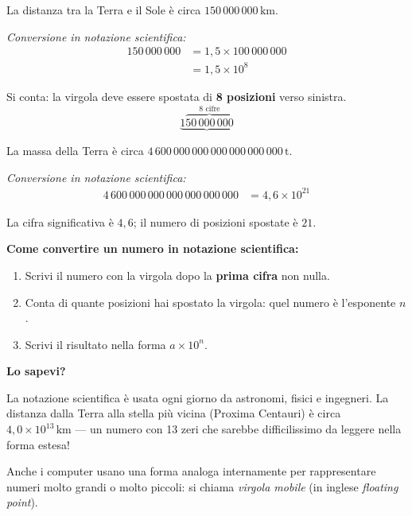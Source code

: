 \begin{esempio}
  La distanza tra la Terra e il Sole è circa $150\,000\,000\,\text{km}$.

  \textit{Conversione in notazione scientifica:}
  \begin{align*}
    150\,000\,000 & = 1{,}5 \times 100\,000\,000 \\
                  & = 1{,}5 \times 10^8
  \end{align*}

  Si conta: la virgola deve essere spostata di \textbf{8 posizioni} verso sinistra.
  \[
    \underbrace{1\overbrace{50\,000\,000}^{8 \text{ cifre}}}
  \]
\end{esempio}

\begin{esempio}
  La massa della Terra è circa $4\,600\,000\,000\,000\,000\,000\,000\,\text{t}$.

  \textit{Conversione in notazione scientifica:}
  \begin{align*}
    4\,600\,000\,000\,000\,000\,000\,000 & = 4{,}6 \times 10^{21}
  \end{align*}

  La cifra significativa è $4{,}6$; il numero di posizioni spostate è $21$.
\end{esempio}

\begin{regola}
  \textbf{Come convertire un numero in notazione scientifica:}
  \begin{enumerate}[leftmargin=2em]
    \item Scrivi il numero con la virgola dopo la \textbf{prima cifra} non nulla.
    \item Conta di quante posizioni hai spostato la virgola: quel numero è l'esponente $n$.
    \item Scrivi il risultato nella forma $a \times 10^n$.
  \end{enumerate}
\end{regola}

\begin{sapevi}
  \textbf{Lo sapevi?}

  La notazione scientifica è usata ogni giorno da astronomi, fisici e ingegneri.
  La distanza dalla Terra alla stella più vicina (Proxima Centauri) è circa
  $4{,}0 \times 10^{13}\,\text{km}$ — un numero con 13 zeri che sarebbe
  difficilissimo da leggere nella forma estesa!

  Anche i computer usano una forma analoga internamente per rappresentare numeri
  molto grandi o molto piccoli: si chiama \textit{virgola mobile} (in inglese
  \textit{floating point}).
\end{sapevi}

